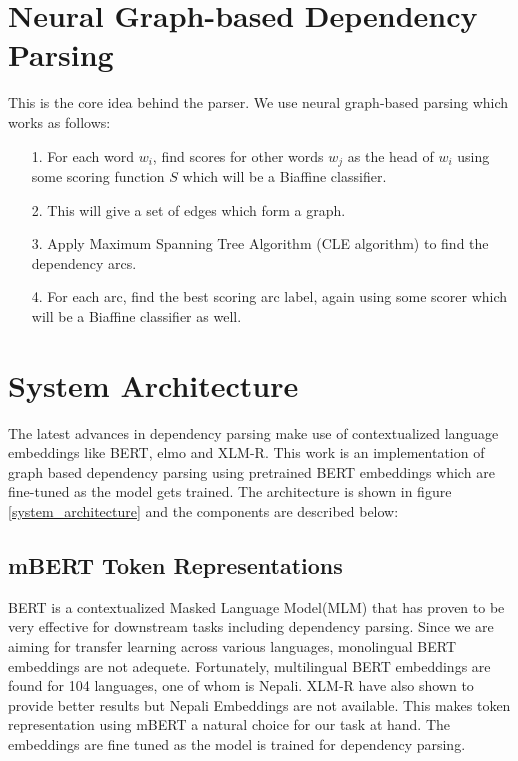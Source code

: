 \section{Neural Graph-based Dependency Parsing}
This is the core idea behind the parser. We use neural graph-based parsing which works as follows:
\begin{itemize}
    \item[1.] For each word $w_i$, find scores for other words $w_j$ as the head of $w_i$ using some scoring function $S$ which will be a Biaffine classifier.
    \item[2.] This will give a set of edges which form a graph.
    \item[3.] Apply Maximum Spanning Tree Algorithm (CLE algorithm) to find the dependency arcs.
    \item[4.] For each arc, find the best scoring arc label, again using some scorer which will be a Biaffine classifier as well.
\end{itemize}

\section{System Architecture}
The latest advances in dependency parsing make use of contextualized language
embeddings like BERT, elmo and XLM-R. This work is an implementation of graph
based dependency parsing using pretrained BERT embeddings which are fine-tuned
as the model gets trained. The architecture is shown in figure
\ref{system_architecture} and the components are described below:

\subsection{mBERT Token Representations}
BERT is a contextualized Masked Language Model(MLM) that has proven to be very
effective for downstream tasks including dependency parsing. Since we are
aiming for transfer learning across various languages, monolingual BERT
embeddings are not adequete. Fortunately, multilingual BERT embeddings are
found for 104 languages, one of whom is Nepali. XLM-R have also shown to
provide better results but Nepali Embeddings are not available.  This makes
token representation using mBERT a natural choice for our task at hand.
The embeddings are fine tuned as the model is trained for dependency parsing.

